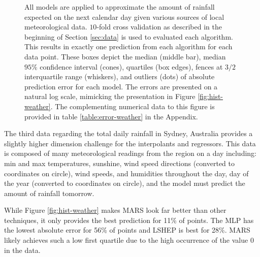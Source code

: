 \documentclass[smallextended,final]{svjour3}       %
\begin{document}
\begin{figure}
  \centering
  \caption{All models are applied to approximate the amount of
    rainfall expected on the next calendar day given various sources
    of local meteorological data. $10$-fold cross validation as
    described in the beginning of Section \ref{sec:data} is used to
    evaluated each algorithm. This results in exactly one prediction
    from each algorithm for each data point. These boxes depict the
    median (middle bar), median $95\%$ confidence interval (cones),
    quartiles (box edges), fences at $3/2$ interquartile range
    (whiskers), and outliers (dots) of absolute prediction error for
    each model. The errors are presented on a natural log scale,
    mimicking the presentation in Figure \ref{fig:hist-weather}. The
    complementing numerical data to this figure is provided in table
    \ref{table:error-weather} in the Appendix.}
  \label{fig:error-weather}
\end{figure}

The third data regarding the total daily rainfall in Sydney, Australia
\cite{williams2009rattle} provides a slightly higher dimension
challenge for the interpolants and regressors. This data is composed
of many meteorological readings from the region on a day including:
min and max temperatures, sunshine, wind speed directions (converted
to coordinates on circle), wind speeds, and humidities throughout the
day, day of the year (converted to coordinates on circle), and the
model must predict the amount of rainfall tomorrow.

While Figure \ref{fig:hist-weather} makes MARS look far better than
other techniques, it only provides the best prediction for 11\% of
points. The MLP has the lowest absolute error for 56\% of points and
LSHEP is best for 28\%. MARS likely achieves such a low first quartile
due to the high occurrence of the value 0 in the data.
\end{document}
